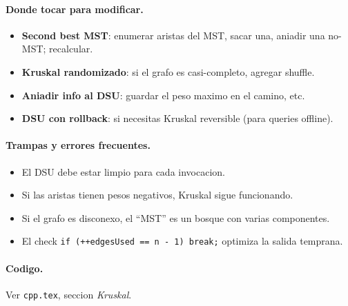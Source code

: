 \paragraph{Donde tocar para modificar.}
\begin{itemize}\setlength\itemsep{0pt}
	\item \textbf{Second best MST}: enumerar aristas del MST, sacar una, aniadir una no-MST; recalcular.
	\item \textbf{Kruskal randomizado}: si el grafo es casi-completo, agregar shuffle.
	\item \textbf{Aniadir info al DSU}: guardar el peso maximo en el camino, etc.
	\item \textbf{DSU con rollback}: si necesitas Kruskal reversible (para queries offline).
\end{itemize}

\paragraph{Trampas y errores frecuentes.}
\begin{itemize}\setlength\itemsep{0pt}
	\item El DSU debe estar limpio para cada invocacion.
	\item Si las aristas tienen pesos negativos, Kruskal sigue funcionando.
	\item Si el grafo es disconexo, el ``MST'' es un bosque con varias componentes.
	\item El check \texttt{if (++edgesUsed == n - 1) break;} optimiza la salida temprana.
\end{itemize}

\paragraph{Codigo.}
Ver \texttt{cpp.tex}, seccion \textit{Kruskal}.

\vspace{0.5em}
